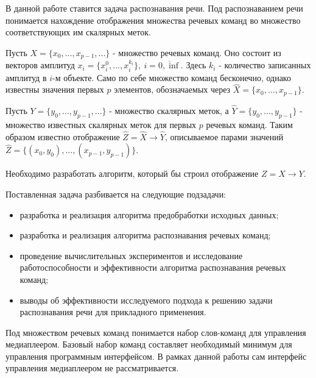 В данной работе ставится задача распознавания речи. Под распознаванием речи понимается нахождение отображения множества речевых команд во множество соответствующих им скалярных меток. 

Пусть $X=\{x_0, ..., x_{p-1}, ...\}$ - множество речевых команд. Оно состоит из векторов амплитуд $x_i=\{x_i^0, ..., x_i^{k_i}\},~i=\overline{0,\inf}$. Здесь $k_i$ - количество записанных амплитуд в $i$-м объекте. Само по себе множество команд бесконечно, однако известны значения первых $p$ элементов, обозначаемых через $\widehat{X}=\{x_0, ..., x_{p-1}\}$.  

Пусть $Y=\{y_0, ..., y_{p-1}, ...\}$ - множество скалярных меток, а $\widehat{Y}=\{y_0, ..., y_{p-1}\}$ - множество известных скалярных меток для первых $p$ речевых команд. Таким образом известно отображение $\widehat{Z}=\widehat{X} \rightarrow \widehat{Y}$, описываемое парами значений $\widehat{Z}=\{(x_0, y_0), ..., (x_{p-1}, y_{p-1})\}$.

Необходимо разработать алгоритм, который бы строил отображение $Z = X \rightarrow Y$.

Поставленная задача разбивается на следующие подзадачи:
\begin{itemize}[leftmargin=2cm]
	\item разработка и реализация алгоритма предобработки исходных данных;
	\item разработка и реализация алгоритма распознавания речевых команд;
	\item проведение вычислительных экспериментов и исследование работоспособности и эффективности алгоритма распознавания речевых команд;
	\item выводы об эффективности исследуемого подхода к решению задачи распознавания речи для прикладного применения.
\end{itemize}

Под множеством речевых команд понимается набор слов-команд для управления медиаплеером. Базовый набор команд составляет необходимый минимум для управления программным интерфейсом. В рамках данной работы сам интерфейс управления медиаплеером не рассматривается.